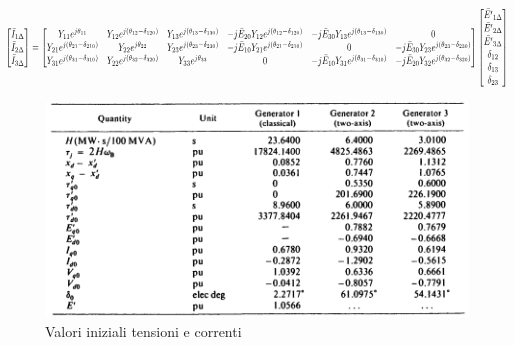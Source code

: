 \documentclass[Lau,noexaminfo]{sapthesis}
\begin{document}
	\begin{equation}
	\resizebox{1.15\hsize}{0.06\vsize}{$%
		\begin{bmatrix}
		\bar{I}_{1\Delta}\\
		\bar{I}_{2\Delta}\\
		\bar{I}_{3\Delta}\\
		\end{bmatrix}=
		\begin{bmatrix}
		Y_{11}e^{j\theta_{11}} & Y_{12}e^{j(\theta_{12}-\delta_{120})} & Y_{13}e^{j(\theta_{13}-\delta_{130})} & -j\bar{E}_{20}Y_{12}e^{j(\theta_{12}-\delta_{120})} & -j\bar{E}_{30}Y_{13}e^{j(\theta_{13}-\delta_{130})} & 0\\
		Y_{21}e^{j(\theta_{21}-\delta_{210})} & Y_{22}e^{j\theta_{22}} & Y_{23}e^{j(\theta_{23}-\delta_{230})} & -j\bar{E}_{10}Y_{21}e^{j(\theta_{21}-\delta_{210})} & 0 & -j\bar{E}_{30}Y_{23}e^{j(\theta_{23}-\delta_{230})}\\
		Y_{31}e^{j(\theta_{31}-\delta_{310})} & Y_{22}e^{j(\theta_{32}-\delta_{320})} & Y_{33}e^{j\theta_{33}} & 0 & -j\bar{E}_{10}Y_{31}e^{j(\theta_{31}-\delta_{310})} & -j\bar{E}_{20}Y_{32}e^{j(\theta_{32}-\delta_{320})}\\
		\end{bmatrix}
		\begin{bmatrix}
		\bar{E'}_{1\Delta}\\
		\bar{E'}_{2\Delta}\\
		\bar{E'}_{3\Delta}\\
		\delta_{12}\\
		\delta_{13}\\
		\delta_{23}
		\end{bmatrix}
		$%
	}%
	\end{equation}
	\begin{figure}
		\centering
		\includegraphics[height=0.32\textheight]{valori_loaflow1}
		\caption{Valori iniziali tensioni e correnti}
	\end{figure}
\end{document}
